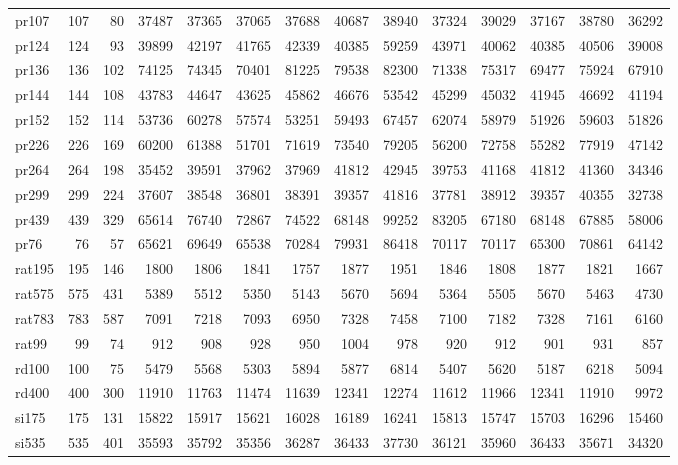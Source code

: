 {\begin{longtable}{l r r r r r r r r r r r r r}
pr107 & 107 & 80 & 37487 & 37365 & 37065 & 37688 & 40687 & 38940 & 37324 & 39029 & 37167 & 38780 & 36292 \\
pr124 & 124 & 93 & 39899 & 42197 & 41765 & 42339 & 40385 & 59259 & 43971 & 40062 & 40385 & 40506 & 39008 \\
pr136 & 136 & 102 & 74125 & 74345 & 70401 & 81225 & 79538 & 82300 & 71338 & 75317 & 69477 & 75924 & 67910 \\
pr144 & 144 & 108 & 43783 & 44647 & 43625 & 45862 & 46676 & 53542 & 45299 & 45032 & 41945 & 46692 & 41194 \\
pr152 & 152 & 114 & 53736 & 60278 & 57574 & 53251 & 59493 & 67457 & 62074 & 58979 & 51926 & 59603 & 51826 \\
pr226 & 226 & 169 & 60200 & 61388 & 51701 & 71619 & 73540 & 79205 & 56200 & 72758 & 55282 & 77919 & 47142 \\
pr264 & 264 & 198 & 35452 & 39591 & 37962 & 37969 & 41812 & 42945 & 39753 & 41168 & 41812 & 41360 & 34346 \\
pr299 & 299 & 224 & 37607 & 38548 & 36801 & 38391 & 39357 & 41816 & 37781 & 38912 & 39357 & 40355 & 32738 \\
pr439 & 439 & 329 & 65614 & 76740 & 72867 & 74522 & 68148 & 99252 & 83205 & 67180 & 68148 & 67885 & 58006 \\
pr76 & 76 & 57 & 65621 & 69649 & 65538 & 70284 & 79931 & 86418 & 70117 & 70117 & 65300 & 70861 & 64142 \\
rat195 & 195 & 146 & 1800 & 1806 & 1841 & 1757 & 1877 & 1951 & 1846 & 1808 & 1877 & 1821 & 1667 \\
rat575 & 575 & 431 & 5389 & 5512 & 5350 & 5143 & 5670 & 5694 & 5364 & 5505 & 5670 & 5463 & 4730 \\
rat783 & 783 & 587 & 7091 & 7218 & 7093 & 6950 & 7328 & 7458 & 7100 & 7182 & 7328 & 7161 & 6160 \\
rat99 & 99 & 74 & 912 & 908 & 928 & 950 & 1004 & 978 & 920 & 912 & 901 & 931 & 857 \\
rd100 & 100 & 75 & 5479 & 5568 & 5303 & 5894 & 5877 & 6814 & 5407 & 5620 & 5187 & 6218 & 5094 \\
rd400 & 400 & 300 & 11910 & 11763 & 11474 & 11639 & 12341 & 12274 & 11612 & 11966 & 12341 & 11910 & 9972 \\
si175 & 175 & 131 & 15822 & 15917 & 15621 & 16028 & 16189 & 16241 & 15813 & 15747 & 15703 & 16296 & 15460 \\
si535 & 535 & 401 & 35593 & 35792 & 35356 & 36287 & 36433 & 37730 & 36121 & 35960 & 36433 & 35671 & 34320 \\

\end{longtable}}
